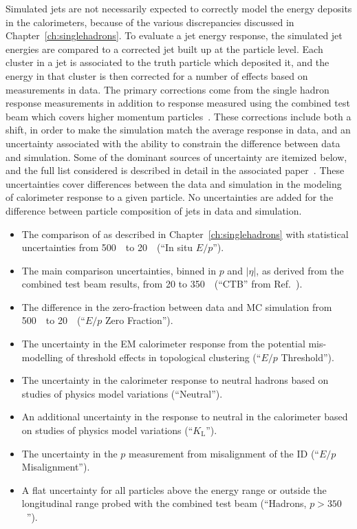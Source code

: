 Simulated jets are not necessarily expected to correctly model the energy deposits in the calorimeters, because of the various discrepancies discussed in Chapter~\ref{ch:singlehadrons}.
To evaluate a jet energy response, the simulated jet energies are compared to a corrected jet built up at the particle level.
Each cluster in a jet is associated to the truth particle which deposited it, and the energy in that cluster is then corrected for a number of effects based on measurements in data. 
The primary corrections come from the single hadron response measurements in addition to response measured using the combined test beam which covers higher momentum particles~\cite{CTB}.
These corrections include both a shift, in order to make the simulation match the average response in data, and an uncertainty associated with the ability to constrain the difference between data and simulation.
Some of the dominant sources of uncertainty are itemized below, and the full list considered is described in detail in the associated paper~\cite{PERF-2015-05}. 
These uncertainties cover differences between the data and simulation in the modeling of calorimeter response to a given particle.
No uncertainties are added for the difference between particle composition of jets in data and simulation.

\begin{itemize}
\item The comparison of \epcor as described in Chapter~\ref{ch:singlehadrons} with statistical uncertainties from 500~\MeV\ to 20~\GeV\ (``In situ $E/p$'').
\item The main \epav comparison uncertainties, binned in $p$ and $|\eta|$, as derived from the combined test beam results, from 20 to 350~\GeV\ (``CTB'' from Ref.~\cite{CTB}).
\item The difference in the zero-fraction between data and MC simulation from 500~\MeV\ to 20~\GeV\ (``$E/p$ Zero Fraction'').
\item The uncertainty in the EM calorimeter response from the potential mis-modelling of threshold effects in topological clustering (``$E/p$ Threshold'').
\item The uncertainty in the calorimeter response to neutral hadrons based on studies of physics model variations (``Neutral'').
\item An additional uncertainty in the response to neutral \pKL in the calorimeter based on studies of physics model variations (``$K_\text{L}$'').
\item The uncertainty in the $p$ measurement from misalignment of the ID (``$E/p$ Misalignment'').
\item A flat uncertainty for all particles above the energy range or outside the longitudinal range probed with the combined test beam (``Hadrons, $p>350$~\GeV'').
\end{itemize}

